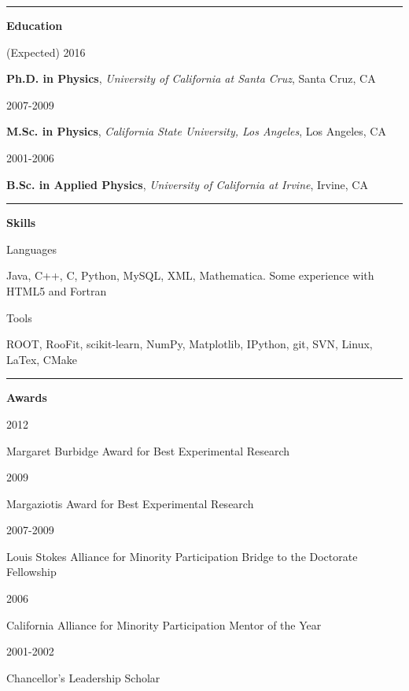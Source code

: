 \documentclass[10pt]{article}
\newcommand{\resumesection}[1] {
    \noindent
    \textcolor{indigodye}{\rule{.15\textwidth}{.1in} \hspace{0.01 \textwidth} \textbf{\Large{#1}}} \newline
}
\newcommand{\educationentry}[4] { 
    \noindent
    \begin{minipage}[t]{0.15\textwidth} \begin{flushright} #1 \end{flushright} \end{minipage} \hspace{0.01\textwidth}
    \begin{minipage}[t]{0.84\textwidth} 
        \textbf{#2}, \emph{#3}, #4
    \end{minipage}
}
\newcommand{\skillsentry}[2] { 
    \noindent
    \begin{minipage}[t]{0.15\textwidth} \begin{flushright} #1 \end{flushright} \end{minipage} \hspace{0.01\textwidth}
    \begin{minipage}[t]{0.84\textwidth} #2 \end{minipage}
}
\newcommand{\awardentry}[2] { 
    \noindent
    \begin{minipage}[t]{0.15\textwidth} \begin{flushright} #1 \end{flushright} \end{minipage} \hspace{0.01\textwidth}
    \begin{minipage}[t]{0.84\textwidth} #2 \end{minipage}
}
\begin{document}
    \resumesection{Education}
        \educationentry{(Expected) 2016}
                       {Ph.D. in Physics}
                       {University of California at Santa Cruz}
                       {Santa Cruz, CA}
        \educationentry{2007-2009}
                       {M.Sc. in Physics}
                       {California State University, Los Angeles}
                       {Los Angeles, CA}
        \educationentry{2001-2006}
                       {B.Sc. in Applied Physics}
                       {University of California at Irvine}
                       {Irvine, CA}

    \resumesection{Skills}
    \skillsentry{Languages}{Java, C++, C, Python, MySQL, XML, Mathematica. Some experience with HTML5 and Fortran}
        \skillsentry{Tools}{ROOT, RooFit, scikit-learn, NumPy, Matplotlib, IPython, git, SVN, Linux, LaTex, CMake}

    \resumesection{Awards}
        \awardentry{2012}{Margaret Burbidge Award for Best Experimental Research}
        \awardentry{2009}{Margaziotis Award for Best Experimental Research}
        \awardentry{2007-2009}{Louis Stokes Alliance for Minority Participation Bridge to the Doctorate 
                               Fellowship}
        \awardentry{2006}{California Alliance for Minority Participation Mentor of the Year}
        \awardentry{2001-2002}{Chancellor's Leadership Scholar}
\end{document}
